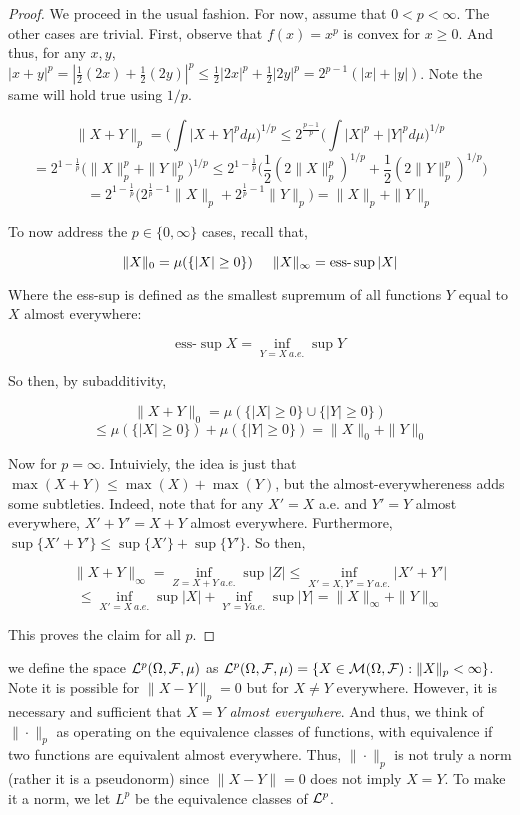     \begin{proof}
        We proceed in the usual fashion. For now, assume that 
        $0 < p < \infty$. The other cases are trivial. First, observe that 
        $f(x) = x^p$ is convex for $x \geq 0$. And thus, for any 
        $x,y$, $|x + y|^p = |\frac{1}{2}(2x) + \frac{1}{2}(2y)|^p \leq 
        \frac{1}{2}|2x|^p + \frac{1}{2}|2y|^p = 2^{p-1}(|x| + |y|)$. Note 
        the same will hold true using $1/p$.

        \[ \|X+Y\|_p = \bigg(\int |X + Y|^p d\mu \bigg)^{1/p} \leq 2^{\frac{p-1}{p}} \bigg( \int|X|^p + |Y|^p d\mu \bigg)^{1/p} \]
        \[ = 2^{1 - \frac{1}{p}} \bigg( \|X\|_p^p + \|Y\|_p^p \bigg)^{1/p} \leq 2^{1-\frac{1}{p}} \bigg( \frac{1}{2} (2\|X\|_p^p)^{1/p} + \frac{1}{2} (2\|Y\|_p^p)^{1/p} \bigg) \]
        \[ = 2^{1- \frac{1}{p}} \bigg(2^{\frac{1}{p} - 1}\|X\|_p + 2^{\frac{1}{p} - 1}\|Y\|_p  \bigg) = \|X\|_p + \|Y\|_p \]

        To now address the $p \in \{0,\infty\}$ cases, recall that, 

        \[ \|X\|_0 = \mu(\{|X| \geq 0 \}) \hspace{0.5cm} \|X\|_\infty = \text{ess-}\sup |X| \]

        Where the ess-sup is defined as the smallest supremum of all functions $Y$ equal to $X$ almost everywhere:

        \[ \text{ess-}\sup X = \inf_{Y = X \: a.e.}\sup Y \]
        
        So then, by subadditivity,

        \[ \|X + Y\|_0 = \mu(\{|X| \geq 0\} \cup \{|Y| \geq 0 \}) \] 
        \[ \leq \mu(\{|X| \geq 0\}) + \mu(\{|Y| \geq 0\}) = \|X\|_0 + \|Y\|_0 \]

        Now for $p = \infty$. Intuiviely, the idea is just that 
        $\max(X + Y) \leq \max(X) + \max(Y)$, but the almost-everywhereness 
        adds some subtleties. Indeed, note that for any 
        $X' = X$ a.e. and $Y' = Y$ almost everywhere, $X' + Y' = X + Y$ almost everywhere. 
        Furthermore, $\sup\{X' + Y'\} \leq \sup\{X'\} + \sup\{Y'\}$. So then, 

        \[ \|X+Y\|_\infty = \inf_{Z = X+Y \: a.e.}\sup |Z| \leq \inf_{X' = X, Y' = Y \: a.e.} |X' + Y'|  \]
        \[ \leq \inf_{X' = X \: a.e.}\sup |X| + \inf_{Y' = Y a.e.}\sup |Y| = \|X\|_\infty+ \|Y\|_\infty \]

        This proves the claim for all $p$.
    \end{proof}

    we define the space $\mathcal L^p(\Omega, \mathcal F, \mu)$ as $\mathcal L^p(\Omega, \mathcal F, \mu) = \{X \in \mathcal M(\Omega, \mathcal F) : \|X\|_p < \infty\}$. Note it is possible for $\|X - Y\|_p = 0$ but for $X \neq Y$ everywhere. However, 
    it is necessary and sufficient that $X = Y$ \emph{almost everywhere}. And thus, 
    we think of $\|\cdot\|_p$ as operating on the equivalence classes of 
    functions, with equivalence if two functions are equivalent almost everywhere. Thus, 
    $\|\cdot\|_p$ is not truly a norm (rather it is a pseudonorm) since 
    $\|X-Y\| = 0$ does not imply $X = Y$. To make it a norm, we let 
    $L^p$ be the equivalence classes of $\mathcal L^p$.

